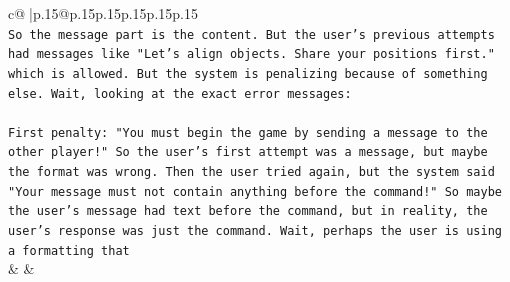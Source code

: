 \documentclass{article}
\begin{document}
{\begin{supertabular}{c@{$\;$}|p{.15\linewidth}@{}p{.15\linewidth}p{.15\linewidth}p{.15\linewidth}p{.15\linewidth}p{.15\linewidth}}
{{{\\ 
\texttt{So the message part is the content. But the user's previous attempts had messages like "Let's align objects. Share your positions first." which is allowed. But the system is penalizing because of something else. Wait, looking at the exact error messages:} \\
\\ 
\texttt{First penalty: "You must begin the game by sending a message to the other player!" So the user's first attempt was a message, but maybe the format was wrong. Then the user tried again, but the system said "Your message must not contain anything before the command!" So maybe the user's message had text before the command, but in reality, the user's response was just the command. Wait, perhaps the user is using a formatting that} \\
            }
        }
    }
    & & \\ \\


\end{supertabular}}
\end{document}

